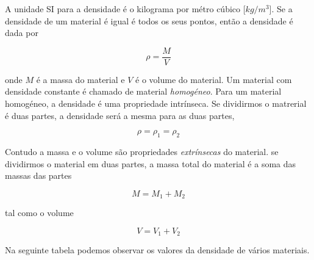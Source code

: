 \documentclass[
  portuguese,
  ]{book}
\begin{document}
A unidade SI para a densidade é o kilograma por métro cúbico {[}\(kg/m^3\){]}. Se a densidade de um material é igual é todos os seus pontos, então a densidade é dada por

\begin{equation}
\rho=\frac{M}{V}
\label{eq:dens2}
\end{equation}

onde \(M\) é a massa do material e \(V\) é o volume do material. Um material com densidade constante é chamado de material \textit{homogéneo}. Para um material homogéneo, a densidade é uma propriedade intrínseca. Se dividirmos o matrerial é duas partes, a densidade será a mesma para as duas partes,

\begin{equation}
\rho=\rho_1=\rho_2
\label{eq:dens3}
\end{equation}

Contudo a massa e o volume são propriedades \textit{extrínsecas} do material. se dividirmos o material em duas partes, a massa total do material é a soma das massas das partes

\begin{equation}
M=M_1+M_2
\label{eq:dens4}
\end{equation}

tal como o volume

\begin{equation}
V=V_1+V_2
\label{eq:dens5}
\end{equation}

Na seguinte tabela podemos observar os valores da densidade de vários materiais.
\end{document}
